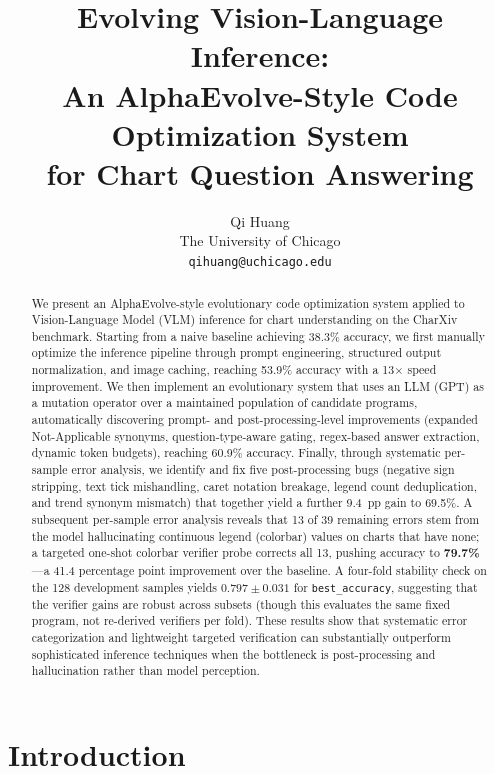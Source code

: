 \documentclass{article}
\title{Evolving Vision-Language Inference:\\
An AlphaEvolve-Style Code Optimization System\\
for Chart Question Answering}
\author{%
  Qi Huang \\
  The University of Chicago \\
  \texttt{qihuang@uchicago.edu}
}
\begin{document}
\maketitle

\begin{abstract}
We present an AlphaEvolve-style evolutionary code optimization system applied to
Vision-Language Model (VLM) inference for chart understanding on the CharXiv
benchmark. Starting from a naive baseline achieving 38.3\% accuracy, we first
manually optimize the inference pipeline through prompt engineering, structured
output normalization, and image caching, reaching 53.9\% accuracy with a
13$\times$ speed improvement. We then implement an evolutionary system that uses
an LLM (GPT) as a mutation operator over a maintained population of candidate
programs, automatically discovering prompt- and post-processing-level
improvements (expanded Not-Applicable synonyms, question-type-aware gating,
regex-based answer extraction, dynamic token budgets), reaching 60.9\% accuracy. Finally, through
systematic per-sample error analysis, we identify and fix five post-processing
bugs (negative sign stripping, text tick mishandling, caret notation breakage,
legend count deduplication, and trend synonym mismatch) that together yield a
further 9.4~pp gain to 69.5\%. A subsequent per-sample error analysis reveals
that 13 of 39 remaining errors stem from the model hallucinating continuous
legend (colorbar) values on charts that have none; a targeted one-shot colorbar
verifier probe corrects all 13, pushing accuracy to \textbf{79.7\%}---a 41.4
percentage point improvement over the baseline.
A four-fold stability check on the 128 development samples yields
$0.797 \pm 0.031$ for \texttt{best\_accuracy}, suggesting that the
verifier gains are robust across subsets (though this evaluates the
same fixed program, not re-derived verifiers per fold).
These results show that
systematic error categorization and lightweight targeted verification can
substantially outperform sophisticated inference techniques when the bottleneck
is post-processing and hallucination rather than model perception.
\end{abstract}

\section{Introduction}
\end{document}
